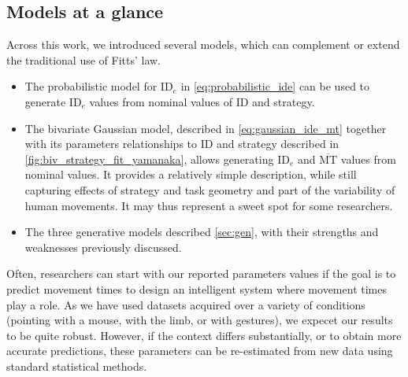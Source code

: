 \documentclass[acmlarge, manuscript,review]{acmart}
\newcommand{\mmt}{\ensuremath{\overline{\mt}}\xspace}
\newcommand{\mt}{\ensuremath{{\text{MT}}}\xspace}
\newcommand{\ide}{\ensuremath{{\text{ID}_e}}\xspace}
\begin{document}
\subsection{Models at a glance}
Across this work, we introduced several models, which can complement or extend the traditional use of Fitts' law.
\begin{itemize}
	\item The probabilistic model for \ide in \autoref{eq:probabilistic_ide} can be used to generate \ide values from nominal values of ID and strategy.
	\item The bivariate Gaussian model, described in \autoref{eq:gaussian_ide_mt} together with its parameters relationships to ID and strategy described in \autoref{fig:biv_strategy_fit_yamanaka}, allows generating \ide and \mmt values from nominal values. It provides a relatively simple description, while still capturing effects of strategy and task geometry and part of the variability of human movements. It may thus represent a sweet spot for some researchers.
	\item The three generative models described \autoref{sec:gen}, with their strengths and weaknesses previously discussed.
\end{itemize}
Often, researchers can start with our reported parameters values if the goal is to predict movement times \eg to design an intelligent system where movement times play a role. As we have used datasets acquired over a variety of conditions (pointing with a mouse, with the limb, or with gestures), we expecet our results to be quite robust. However, if the context differs substantially, or to obtain more accurate predictions, these parameters can be re-estimated from new data using standard statistical methods.
\end{document}
